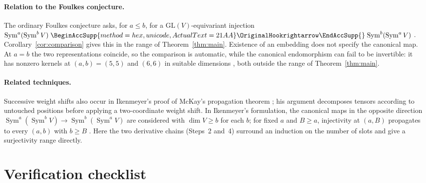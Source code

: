\documentclass[11pt]{article}
\renewcommand{\hookrightarrow}{\mathrel{
  \BeginAccSupp{method=hex,unicode,ActualText=21AA}
  \OriginalHookrightarrow\EndAccSupp{}}}
\theoremstyle{definition}
\theoremstyle{remark}
\DeclareMathOperator{\Sym}{Sym}
\begin{document}
\paragraph{Relation to the Foulkes conjecture.}
The ordinary Foulkes conjecture \cite{Foulkes1950} asks, for $a\le b$, for
a $\mathrm{GL}(V)$-equivariant injection
$\Sym^a(\Sym^b V)\hookrightarrow\Sym^b(\Sym^a V)$
\cite[Conjecture~2.10]{RSW}. Corollary~\ref{cor:comparison} gives this in
the range of Theorem~\ref{thm:main}. Existence of an embedding does not
specify the canonical map. At $a=b$ the two representations coincide, so the
comparison is automatic, while the canonical endomorphism can fail to be
invertible: it has nonzero kernels at $(a,b)=(5,5)$ and $(6,6)$ in suitable
dimensions
\cite[arXiv version, Theorem~6(b),(c) and Remark~7]{CIM}, both outside the
range of Theorem~\ref{thm:main}.

\paragraph{Related techniques.}
Successive weight shifts also occur in Ikenmeyer's proof
\cite[Section~5]{Ikenmeyer} of McKay's propagation theorem \cite{McKay};
his argument \cite[Section~5, Claim~5.1]{Ikenmeyer} decomposes tensors
according to untouched positions before applying a two-coordinate weight
shift. In Ikenmeyer's formulation, the canonical maps in the opposite
direction $\Sym^a(\Sym^b V)\longrightarrow\Sym^b(\Sym^a V)$ are considered
with $\dim V\ge b$ for each $b$; for fixed $a$ and $B\ge a$, injectivity at
$(a,B)$ propagates to every $(a,b)$ with $b\ge B$
\cite[Theorem~1.3 and Section~3]{Ikenmeyer}. Here the two derivative chains
(Steps~2 and~4) surround an induction on the number of slots and give a
surjectivity range directly.

\section{Verification checklist}
\end{document}
